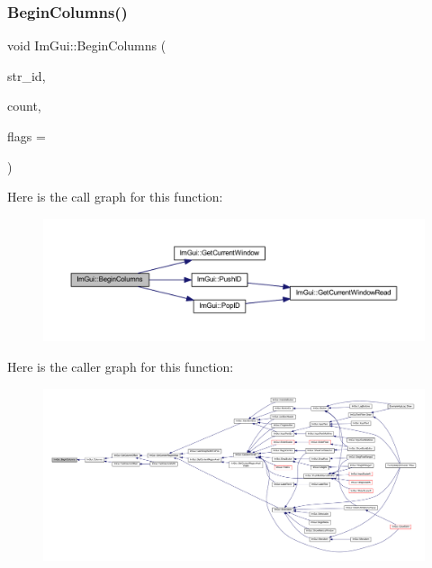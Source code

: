 \subsubsection{\texorpdfstring{Begin\+Columns()}{BeginColumns()}}
{\footnotesize\ttfamily void Im\+Gui\+::\+Begin\+Columns (\begin{DoxyParamCaption}\item[{const char $\ast$}]{str\+\_\+id,  }\item[{int}]{count,  }\item[{\mbox{\hyperlink{imgui_8h_a0edb3053546fcf6c5f7dcb7531c3a17a}{Im\+Gui\+Columns\+Flags}}}]{flags = {} }\end{DoxyParamCaption})}

Here is the call graph for this function\+:
\nopagebreak
\begin{figure}[H]
\begin{center}
\leavevmode
\includegraphics[width=350pt]{namespace_im_gui_a6992289cbdb087a690403e48340bfb23_cgraph}
\end{center}
\end{figure}
Here is the caller graph for this function\+:
\nopagebreak
\begin{figure}[H]
\begin{center}
\leavevmode
\includegraphics[width=350pt]{namespace_im_gui_a6992289cbdb087a690403e48340bfb23_icgraph}
\end{center}
\end{figure}
\mbox{\label{namespace_im_gui_aa895095bdc7a2907375c555e245575ea}} 
